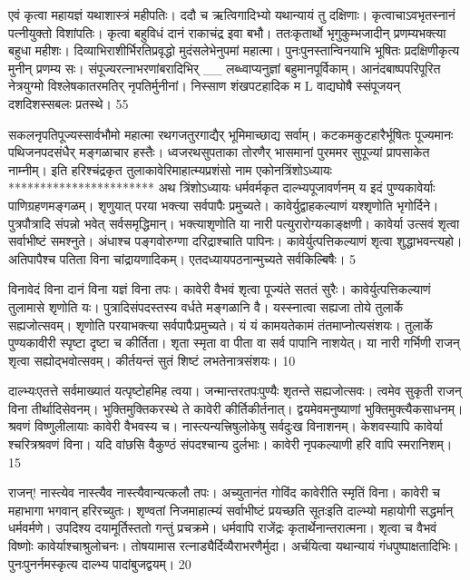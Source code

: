 एवं कृत्वा महायज्ञं यथाशास्त्रं महीपतिः।
ददौ च ऋत्विगादिभ्यो यथान्यायं तु दक्षिणाः।
कृत्वाचाऽवभृतस्नानं पत्नीयुक्तो विशांपतिः।
कृत्वा बहुविधं दानं राकाचंद्र इवा बभौ।
ततःकृतार्थो भृगुकुम्भजादीन्
प्रणम्यभक्त्या बहुधा महीशः।
दिव्याभिराशीर्भिरतिप्रवृद्धो
मुदंसलेभेनुपमां महात्मा।
पुनःपुनस्तान्विनयाभि भूषितः
प्रदक्षिणीकृत्य मुनीन् प्रणम्य सः।
संपूज्यरत्नाभरणांबरादिभिर्
__ लब्ध्वाप्यनुज्ञां बहुमानपूर्विकाम्।
आनंदबाष्पपरिपूरित नेत्रयुग्मो
विश्लेषकातरमतिर् नृपतिर्मुनीनां।
निस्साण शंखपटहादिक
म
L
वाद्यघोषै स्संपूजयन् दशदिशस्सबलः प्रतस्थे।
55

सकलनृपतिपूज्यस्सार्वभौमो महात्मा
रथगजतुरगाद्यैर् भूमिमाच्छाद्य सर्वाम्।
कटकमकुटहारैर्भूषितः पूज्यमानः
पथिजनपदसंधैर् मङ्गळाचार हस्तैः।
ध्वजरथसुपताका तोरणैर् भासमानां
पुरममर सुपूज्यां प्रापसाकेत नाम्नीम्।
इति हरिश्चंद्रकृत तुलाकावेरिमाहात्म्यप्रशंसो नाम
एकोनत्रिंशोऽध्यायः
***********************
अथ त्रिंशोऽध्यायः
धर्मवर्मकृत दाल्भ्यपूजावर्णनम् य इदं पुण्यकावेर्याः पाणिग्रहणमङ्गळम्।
शृणुयात् परया भक्त्या सर्वपापैः प्रमुच्यते।
कावेर्युद्वाहकल्याणं यश्शृणोति भृगोर्दिने।
पुत्रपौत्रादि संपन्नो भवेत् सर्वसमृद्धिमान्।
भक्त्याशृणोति या नारी पत्युरारोग्यकाङ्क्षणी।
कावेर्या उत्सवं शृत्वा सर्वाभीष्टं समश्नुते।
अंधाश्च पङ्गवोरुग्णा दरिद्राश्चाति पापिनः।
कावेर्युत्पत्तिकल्याणं शृत्वा शुद्धाभवन्त्यहो।
अतिपापैश्च पतिता विना चांद्रायणादिकम्।
एतदध्यायपठनान्मुच्यते सर्वकिल्बिषैः।
5


विनावेदं विना दानं विना यज्ञं विना तपः।
कावेरी वैभवं शृत्वा पूज्यंते सततं सुरैः।
कावेर्युत्पत्तिकल्याणं तुलामासे शृणोति यः।
पुत्रादिसंपदस्तस्य वर्धते मङ्गळानि वै।
यस्स्नात्वा सह्यजा तोये तुलार्के सह्यजोत्सवम्।
शृणोति परयाभक्त्या सर्वपापैःप्रमुच्यते।
यं यं कामयतेकामं तंतमाप्नोत्यसंशयः।
तुलार्के पुण्यकावीरी स्पृष्टा दृष्टा च कीर्तिता।
शृता स्मृता वा पीता वा सर्व पापानि नाशयेत्।
या नारी गर्भिणी राजन् शृत्वा सह्योद्भवोत्सवम्।
कीर्तयन्तं सुतं शिष्टं लभतेनात्रसंशयः।
10

दाल्भ्यःएतत्ते सर्वमाख्यातं यत्पृष्टोहमिह त्वया।
जन्मान्तरतपःपुण्यैः शृतन्ते सह्यजोत्सवः।
त्वमेव सुकृती राजन् विना तीर्थादिसेवनम्।
भुक्तिमुक्तिकरस्थे ते कावेरी कीर्तिकीर्तनात्।
द्वयमेवमनुष्याणां भुक्तिमुक्त्यैकसाधनम्।
श्रवणं विष्णुलीलायाः कावेरी वैभवस्य च।
नास्त्यन्यत्त्रिषुलोकेषु सर्वदुःख विनाशनम्।
केशवस्यापि कावेर्या श्चरित्रश्रवणं विना।
यदि वांछसि वैकुण्ठं संपदश्चान्य दुर्लभाः।
कावेरी नृपकल्याणी हरि वापि स्मरानिशम्।
15


राजन्! नास्त्येव नास्त्यैव नास्त्यैवान्यत्कलौ तपः।
अच्युतानंत गोविंद कावेरीति स्मृतिं विना।
कावेरी च महाभागा भगवान् हरिरच्युतः।
शृण्वतां निजमाहात्म्यं सर्वाभीष्टं प्रयच्छति सूतःइति दाल्भ्यो महायोगी सद्धर्मान् धर्मवर्मणे।
उपदिश्य दयामूर्तिस्ततो गन्तुं प्रचक्रमे।
धर्मवापि राजेंद्रः कृतार्थेनान्तरात्मना।
शृत्वा च वैभवं विष्णोः कावेर्याश्चाश्रुलोचनः।
तोषयामास रत्नाड्यैर्दिव्यैराभरणैर्मुदा।
अर्चयित्वा यथान्यायं गंधपुष्पाक्षतादिभिः।
पुनःपुनर्नमस्कृत्य दाल्भ्य पादांबुजद्वयम्।
20

